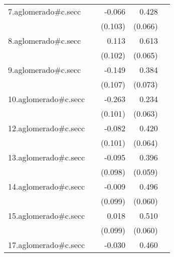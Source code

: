 {\begin{longtable}{l*{4}{D{.}{.}{-1}}}
\addlinespace
7.aglomerado#c.secc&                     &      -0.066         &       0.428\sym{***}&                     \\
            &                     &     (0.103)         &     (0.066)         &                     \\
\addlinespace
8.aglomerado#c.secc&                     &       0.113         &       0.613\sym{***}&                     \\
            &                     &     (0.102)         &     (0.065)         &                     \\
\addlinespace
9.aglomerado#c.secc&                     &      -0.149         &       0.384\sym{***}&                     \\
            &                     &     (0.107)         &     (0.073)         &                     \\
\addlinespace
10.aglomerado#c.secc&                     &      -0.263\sym{**} &       0.234\sym{***}&                     \\
            &                     &     (0.101)         &     (0.063)         &                     \\
\addlinespace
12.aglomerado#c.secc&                     &      -0.082         &       0.420\sym{***}&                     \\
            &                     &     (0.101)         &     (0.064)         &                     \\
\addlinespace
13.aglomerado#c.secc&                     &      -0.095         &       0.396\sym{***}&                     \\
            &                     &     (0.098)         &     (0.059)         &                     \\
\addlinespace
14.aglomerado#c.secc&                     &      -0.009         &       0.496\sym{***}&                     \\
            &                     &     (0.099)         &     (0.060)         &                     \\
\addlinespace
15.aglomerado#c.secc&                     &       0.018         &       0.510\sym{***}&                     \\
            &                     &     (0.099)         &     (0.060)         &                     \\
\addlinespace
17.aglomerado#c.secc&                     &      -0.030         &       0.460\sym{***}&                     \\

\end{longtable}}
